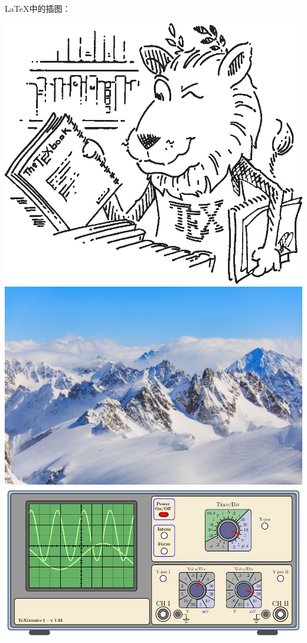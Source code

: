 \documentclass{ctexart}
\begin{document}
    
    \LaTeX{}中的插图：

    \includegraphics{lion.eps}
    \includegraphics{mountain.jpg}
    \includegraphics{oscilloscope.pdf}
\end{document}
